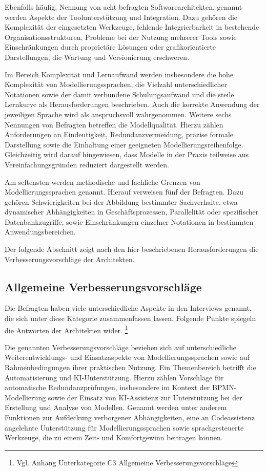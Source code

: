 Ebenfalls häufig, Nennung von acht befragten Softwarearchitekten, genannt werden Aspekte der Toolunterstützung und Integration. Dazu gehören die Komplexität der eingesetzten Werkzeuge, fehlende Integrierbarkeit in bestehende Organisationsstrukturen, Probleme bei der Nutzung mehrerer Tools sowie Einschränkungen durch proprietäre Lösungen oder grafikorientierte Darstellungen, die Wartung und Versionierung erschweren.

Im Bereich Komplexität und Lernaufwand werden insbesondere die hohe Komplexität von Modellierungssprachen, die Vielzahl unterschiedlicher Notationen sowie der damit verbundene Schulungsaufwand und die steile Lernkurve als Herausforderungen beschrieben. Auch die korrekte Anwendung der jeweiligen Sprache wird als anspruchsvoll wahrgenommen.
Weitere sechs Nennungen von Befragten betreffen die Modellqualität. Hierzu zählen Anforderungen an Eindeutigkeit, Redundanzvermeidung, präzise formale Darstellung sowie die Einhaltung einer geeigneten Modellierungsreihenfolge. Gleichzeitig wird darauf hingewiesen, dass Modelle in der Praxis teilweise aus Vereinfachungsgründen reduziert dargestellt werden.

Am seltensten werden methodische und fachliche Grenzen von Modellierungssprachen genannt. Hierauf verweisen fünf der Befragten. Dazu gehören Schwierigkeiten bei der Abbildung bestimmter Sachverhalte, etwa dynamischer Abhängigkeiten in Geschäftsprozessen, Parallelität oder spezifischer Datenbankzugriffe, sowie Einschränkungen einzelner Notationen in bestimmten Anwendungsbereichen.

Der folgende Abschnitt zeigt nach den hier beschriebenen Herausforderungen die Verbesserungsvorschläge der Architekten.

\subsection{Allgemeine Verbesserungsvorschläge}

Die Befragten haben viele unterschiedliche Aspekte in den Interviews genannt, die sich unter diese Kategorie zusammenfassen lassen. Folgende Punkte spiegeln die Antworten der Architekten wider. \footnote{Vgl. Anhang Unterkategorie C3 Allgemeine Verbesserungsvorschläge}

Die genannten Verbesserungsvorschläge beziehen sich auf unterschiedliche Weiterentwicklungs- und Einsatzaspekte von Modellierungssprachen sowie auf Rahmenbedingungen ihrer praktischen Nutzung. Ein Themenbereich betrifft die Automatisierung und KI-Unterstützung. Hierzu zählen Vorschläge für automatische Redundanzprüfungen, insbesondere im Kontext der BPMN-Modellierung sowie der Einsatz von KI-Assistenz zur Unterstützung bei der Erstellung und Analyse von Modellen. Genannt werden unter anderem Funktionen zur Aufdeckung verborgener Abhängigkeiten, eine an Codeassistenz angelehnte Unterstützung für Modellierungssprachen sowie sprachgesteuerte Werkzeuge, die zu einem Zeit- und Komfortgewinn beitragen können.

